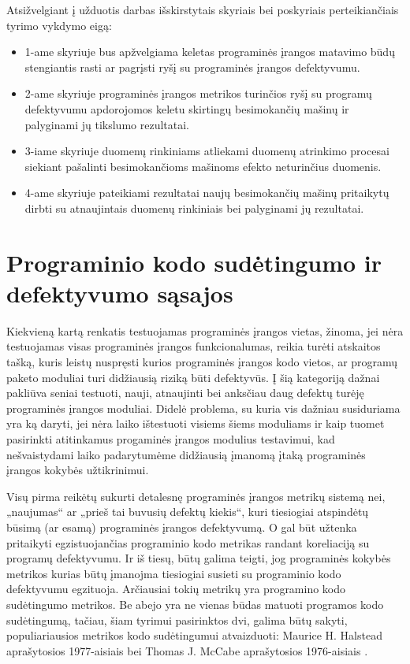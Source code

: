\documentclass{VUMIFPSbakalaurinis}
\begin{document}
Atsižvelgiant į užduotis darbas išskirstytais skyriais bei poskyriais perteikiančiais tyrimo vykdymo eigą:
\begin{itemize}
\item[] 1-ame skyriuje bus apžvelgiama keletas programinės įrangos matavimo būdų stengiantis rasti ar pagrįsti ryšį su programinės įrangos defektyvumu.
\item[] 2-ame skyriuje programinės įrangos metrikos turinčios ryšį su programų defektyvumu apdorojomos keletu skirtingų besimokančių mašinų ir palyginami jų tikslumo rezultatai.
\item[] 3-iame skyriuje duomenų rinkiniams atliekami duomenų atrinkimo procesai siekiant pašalinti besimokančioms mašinoms efekto neturinčius duomenis.
\item[] 4-ame skyriuje pateikiami rezultatai naujų besimokančių mašinų pritaikytų dirbti su atnaujintais duomenų rinkiniais bei palyginami jų rezultatai.
\end{itemize}
 
\section{Programinio kodo sudėtingumo ir defektyvumo sąsajos}
Kiekvieną kartą renkatis testuojamas programinės įrangos vietas, žinoma, jei nėra testuojamas visas programinės įrangos funkcionalumas, reikia turėti atskaitos tašką, kuris leistų nuspręsti kurios programinės įrangos kodo vietos, ar programų paketo moduliai turi didžiausią riziką būti defektyvūs. Į šią kategoriją dažnai pakliūva seniai testuoti, nauji, atnaujinti bei anksčiau daug defektų turėję programinės įrangos moduliai. Didelė problema, su kuria vis dažniau susiduriama yra ką daryti, jei nėra laiko ištestuoti visiems šiems moduliams ir kaip tuomet pasirinkti atitinkamus progaminės įrangos modulius testavimui, kad nešvaistydami laiko padarytumėme didžiausią įmanomą įtaką programinės įrangos kokybės užtikrinimui. 

Visų pirma reikėtų sukurti detalesnę programinės įrangos metrikų sistemą nei, „naujumas“ ar „prieš tai buvusių defektų kiekis“, kuri tiesiogiai atspindėtų būsimą (ar esamą) programinės įrangos defektyvumą. O gal būt užtenka pritaikyti egzistuojančias programinio kodo metrikas randant koreliaciją su programų defektyvumu. Ir iš tiesų, būtų galima teigti, jog programinės kokybės metrikos kurias būtų įmanojma tiesiogiai susieti su programinio kodo defektyvumu egzituoja. Arčiausiai tokių metrikų yra programino kodo sudėtingumo metrikos. Be abejo yra ne vienas būdas matuoti programos kodo sudėtingumą, tačiau, šiam tyrimui pasirinktos dvi, galima būtų sakyti, populiariausios metrikos kodo sudėtingumui atvaizduoti: Maurice H. Halstead aprašytosios 1977-aisiais \cite{Halstead:1977:ESS:540137} bei Thomas J. McCabe aprašytosios 1976-aisiais \cite{McCabe:1976:CM:800253.807712}. 
\end{document}
